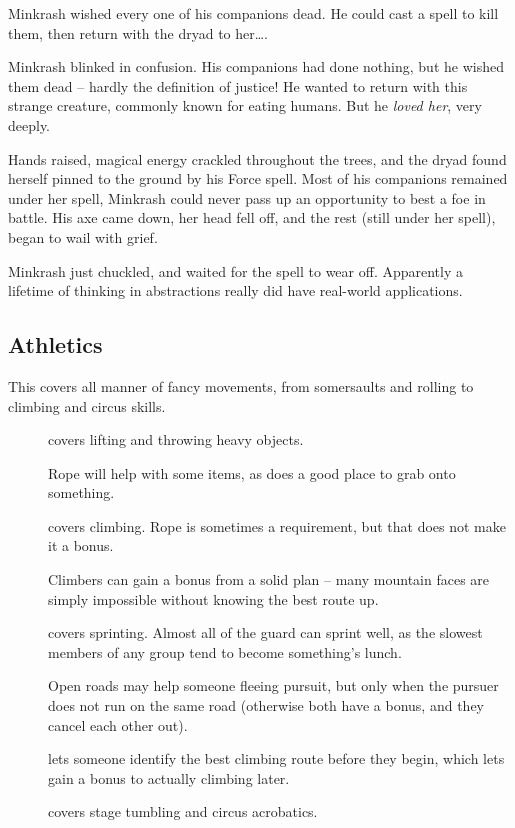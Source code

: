 \begin{multicols}{2}
\begin{exampletext}

  Minkrash wished every one of his companions dead.
  He could cast a spell to kill them, then return with the dryad to her\ldots.

  Minkrash blinked in confusion. 
  His companions had done nothing, but he wished them dead -- hardly the definition of justice!
  He wanted to return with this strange creature, commonly known for eating humans.
  But he \emph{loved her}, very deeply.

  Hands raised, magical energy crackled throughout the trees, and the dryad found herself pinned to the ground by his Force spell.
  Most of his companions remained under her spell, Minkrash could never pass up an opportunity to best a foe in battle.
  His axe came down, her head fell off, and the rest (still under her spell), began to wail with grief.

  Minkrash just chuckled, and waited for the spell to wear off.
  Apparently a lifetime of thinking in abstractions really did have real-world applications.

\end{exampletext}

\subsection{Athletics}

This covers all manner of fancy movements, from somersaults and rolling to climbing and circus skills.


\begin{description}
  \item[]
    covers lifting and throwing heavy objects.

    Rope will help with some items, as does a good place to grab onto something.
  \item[]
    covers climbing.
    Rope is sometimes a requirement, but that does not make it a bonus.

    Climbers can gain a bonus from a solid plan -- many mountain faces are simply impossible without knowing the best route up.
  \item[]
    covers sprinting.
    Almost all of the \gls{guard} can sprint well, as the slowest members of any group tend to become something's lunch.

    Open roads may help someone fleeing pursuit, but only when the pursuer does not run on the same road (otherwise both have a bonus, and they cancel each other out).
  \item[]
    lets someone identify the best climbing route before they begin, which lets gain a bonus to actually climbing later.
  \item[]
    covers stage tumbling and circus acrobatics.
\end{description}


\end{multicols}
